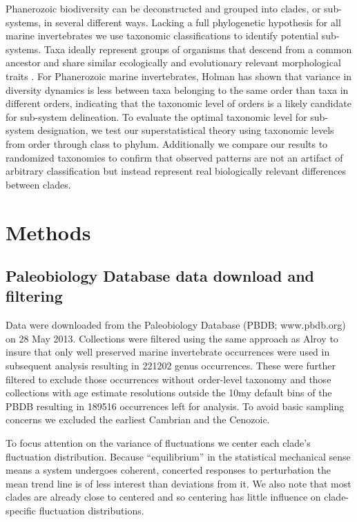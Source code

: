 \documentclass[11pt]{article}
\begin{document}
Phanerozoic biodiversity can be deconstructed and grouped into clades,
or sub-systems, in several different ways. Lacking a full phylogenetic
hypothesis for all marine invertebrates we use taxonomic
classifications to identify potential sub-systems.  Taxa ideally
represent groups of organisms that descend from a common ancestor and
share similar ecologically and evolutionary relevant morphological
traits \citep{mayr1965systZool, erwin2007}.  For Phanerozoic marine
invertebrates, Holman \citep{holman1989} has shown that variance in
diversity dynamics is less between taxa belonging to the same order
than taxa in different orders, indicating that the taxonomic level of
orders is a likely candidate for sub-system delineation. To evaluate
the optimal taxonomic level for sub-system designation, we test our
superstatistical theory using taxonomic levels from order through
class to phylum. Additionally we compare our results to randomized
taxonomies to confirm that observed patterns are not an artifact of
arbitrary classification but instead represent real biologically
relevant differences between clades.

\section{Methods}

\subsection{Paleobiology Database data download and filtering}
Data were downloaded from the Paleobiology Database (PBDB;
www.pbdb.org) on 28 May 2013. Collections were filtered using the same
approach as Alroy \citep{alroy08} to insure that only well preserved
marine invertebrate occurrences were used in subsequent analysis
resulting in 221202 genus occurrences. These were further filtered to
exclude those occurrences without order-level taxonomy and those
collections with age estimate resolutions outside the 10my default
bins of the PBDB resulting in 189516 occurrences left for analysis. To
avoid basic sampling concerns we excluded the earliest Cambrian and
the Cenozoic.

To focus attention on the variance of fluctuations we center each
clade's fluctuation distribution. Because ``equilibrium'' in the
statistical mechanical sense means a system undergoes coherent,
concerted responses to perturbation the mean trend line is of less
interest than deviations from it. We also note that most clades are
already close to centered and so centering has little influence on
clade-specific fluctuation distributions.
\end{document}
